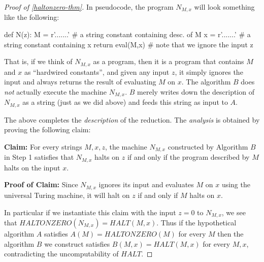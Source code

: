 \begin{proof}[Proof of \cref{haltonzero-thm}]
In pseudocode, the program \(N_{M,x}\) will look something like the
following:

\begin{code}
def N(z):
    M = r'.......'
    # a string constant containing desc. of M
    x = r'.......'
    # a string constant containing x
    return eval(M,x)
    # note that we ignore the input z
\end{code}

That is, if we think of \(N_{M,x}\) as a program, then it is a program
that contains \(M\) and \(x\) as ``hardwired constants'', and given any
input \(z\), it simply ignores the input and always returns the result
of evaluating \(M\) on \(x\). The algorithm \(B\) does \emph{not}
actually execute the machine \(N_{M,x}\). \(B\) merely writes down the
description of \(N_{M,x}\) as a string (just as we did above) and feeds
this string as input to \(A\).

The above completes the \emph{description} of the reduction. The
\emph{analysis} is obtained by proving the following claim:

\textbf{Claim:} For every strings \(M,x,z\), the machine \(N_{M,x}\)
constructed by Algorithm \(B\) in Step 1 satisfies that \(N_{M,x}\)
halts on \(z\) if and only if the program described by \(M\) halts on
the input \(x\).

\textbf{Proof of Claim:} Since \(N_{M,x}\) ignores its input and
evaluates \(M\) on \(x\) using the universal Turing machine, it will
halt on \(z\) if and only if \(M\) halts on \(x\).

In particular if we instantiate this claim with the input \(z=0\) to
\(N_{M,x}\), we see that
\(\ensuremath{\mathit{HALTONZERO}}(N_{M,x})=\ensuremath{\mathit{HALT}}(M,x)\).
Thus if the hypothetical algorithm \(A\) satisfies
\(A(M)=\ensuremath{\mathit{HALTONZERO}}(M)\) for every \(M\) then the
algorithm \(B\) we construct satisfies
\(B(M,x)=\ensuremath{\mathit{HALT}}(M,x)\) for every \(M,x\),
contradicting the uncomputability of \(\ensuremath{\mathit{HALT}}\).

\end{proof}

\hypertarget{hardwiringrem}{}

